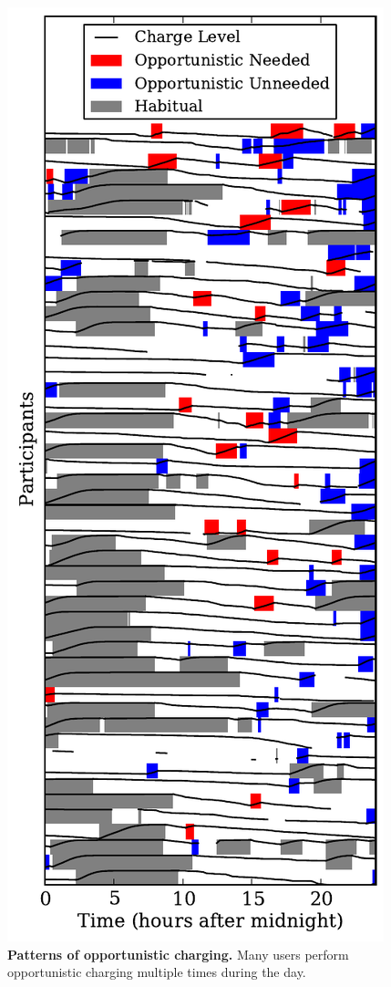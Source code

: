 \begin{figure}[th!]
\includegraphics[width=\columnwidth]{./figures/power/opportunistic_charging/count_and_by_time/graph.pdf}
\caption{\textbf{Patterns of opportunistic charging.} Many users perform
opportunistic charging multiple times during the day.}
\label{fig-opportunistic-patterns}
\end{figure}

